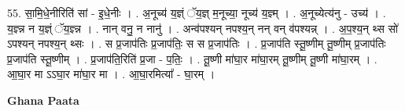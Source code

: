 \documentclass[17pt]{extarticle}
\begin{document}
55. सा॒मि॒धे॒नीरिति॑ सां - इ॒धे॒नीः । . अ॒नूच्य॑ य॒ज्ञ्ं ॅय॒ज्ञ् म॒नूच्या॒ नूच्य॑ य॒ज्ञ्म् । . अ॒नूच्येत्य॑नु - उच्य॑ । . य॒ज्ञ्न्न न य॒ज्ञ्ं ॅय॒ज्ञ्न्न । . नान् वनु॒ न नानु॑ । . अन्व॑पश्यन् नपश्य॒न् नन् वन् व॑पश्यन्न् । . अ॒प॒श्य॒न् थ्स सो॑ ऽपश्यन् नपश्य॒न् थ्सः । . स प्र॒जाप॑तिः प्र॒जाप॑तिः॒ स स प्र॒जाप॑तिः । . प्र॒जाप॑ति स्तू॒ष्णीम् तू॒ष्णीम् प्र॒जाप॑तिः प्र॒जाप॑ति स्तू॒ष्णीम् । . प्र॒जाप॑ति॒रिति॑ प्र॒जा - प॒तिः॒ । . तू॒ष्णी मा॑घा॒र मा॑घा॒रम् तू॒ष्णीम् तू॒ष्णी मा॑घा॒रम् । . आ॒घा॒र मा ऽऽघा॒र मा॑घा॒र मा । . आ॒घा॒रमित्या᳚ - घा॒रम् । \newline

\textbf{Ghana Paata } \newline
\end{document}
